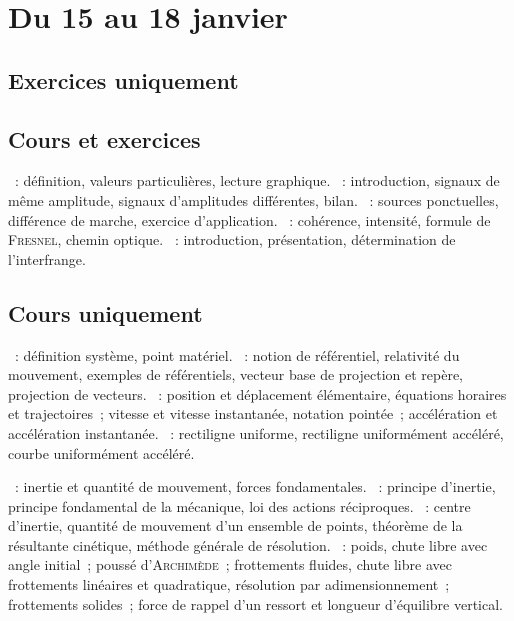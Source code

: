 \documentclass[a4paper, 12pt, final, garamond]{book}
\begin{document}
\setcounter{chapter}{13}

\chapter{Du 15 au 18 janvier}

\section{Exercices uniquement}
\section{Cours et exercices}
\begin{enumerate}[label=\Roman*]
	~: définition, valeurs particulières,
	lecture graphique.
	~:
	introduction, signaux de même amplitude, signaux d'amplitudes
	différentes, bilan.
	~: sources ponctuelles,
	différence de marche, exercice d'application.
	~: cohérence, intensité, formule de
	\textsc{Fresnel}, chemin optique.
	~: introduction,
	présentation, détermination de l'interfrange.
\end{enumerate}

\section{Cours uniquement}
\begin{enumerate}[label=\Roman*]
	~: définition système, point
	matériel.
	~: notion de
	référentiel, relativité du mouvement, exemples de référentiels, vecteur
	base de projection et repère, projection de vecteurs.
	~: position et déplacement
	élémentaire, équations horaires et trajectoires~; vitesse et vitesse
	instantanée, notation pointée~; accélération et accélération
	instantanée.
	~: rectiligne uniforme, rectiligne
	uniformément accéléré, courbe uniformément accéléré.
\end{enumerate}

\begin{enumerate}[label=\Roman*]
	~: inertie et quantité de mouvement, forces
	fondamentales.
	~: principe d'inertie, principe
	fondamental de la mécanique, loi des actions réciproques.
	~: centre d'inertie, quantité de mouvement
	d'un ensemble de points, théorème de la résultante cinétique, méthode
	générale de résolution.
	~: poids, chute libre avec angle initial~; poussé
	d'\textsc{Archimède}~; frottements fluides, chute libre avec frottements
	linéaires et quadratique, résolution par adimensionnement~; frottements
	solides~; force de rappel d'un ressort et longueur d'équilibre vertical.
\end{enumerate}
\end{document}

